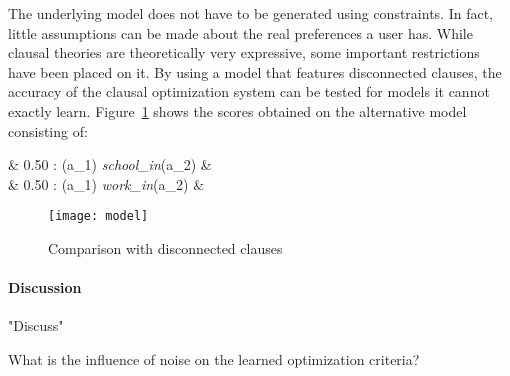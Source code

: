 \begin{experiment}
	The underlying model does not have to be generated using constraints.
	In fact, little assumptions can be made about the real preferences a user has.
	While clausal theories are theoretically very expressive, some important restrictions have been placed on it.
	By using a model that features disconnected clauses, the accuracy of the clausal optimization system can be tested for models it cannot exactly learn.
	Figure~\ref{fig:co_acc_model} shows the scores obtained on the alternative model consisting of:

	\begin{shiftedflalign*}
		& \text{ }0.50 :  \leftarrow {}(a_1) \land \textit{school\_in}(a_2) & \\
		& \text{ }0.50 :  \leftarrow {}(a_1) \land \textit{work\_in}(a_2) &
	\end{shiftedflalign*}

	\begin{figure}

		\caption{Comparison with disconnected clauses}
		\centering
			\texttt{[image: model]}
		\label{fig:co_acc_model}

	\end{figure}


\end{experiment}

\paragraph{Discussion}
"Discuss"

\begin{question}
	What is the influence of noise on the learned optimization criteria?
\end{question}

